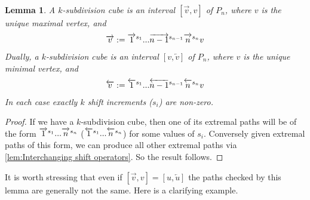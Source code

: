 \documentclass{amsart}
\newtheorem{lemma}[theorem]{Lemma}
\theoremstyle{definition}
\newcommand{\rightshiftk}[2]{\overrightarrow{\vphantom{1}{#1}}^{#2}}
\newcommand{\leftshiftk}[2]{\overleftarrow{\vphantom{1}{#1}}^{#2}}
\begin{document}
\begin{lemma} \label{lem:subdiv cubes are intervals}
A $k$-subdivision cube is an interval $[\overrightarrow{v},v]$ of $P_n$, where $v$ is the unique maximal vertex, and 
\begin{align*}
    \overrightarrow{v}:= \rightshiftk{1}{s_1}... \rightshiftk{n-1}{s_{n-1}}\rightshiftk{n}{s_n}v
\end{align*}
Dually, a $k$-subdivision cube is an interval $[v,\overleftarrow{v}]$ of $P_n$, where $v$ is the unique minimal vertex, and 
\begin{align*}
    \overleftarrow{v} :=\leftshiftk{1}{s_1}...\leftshiftk{n-1}{s_{n-1}}\leftshiftk{n}{s_n}v
\end{align*}
In each case exactly $k$ shift increments ($s_i$) are non-zero.
\end{lemma}
\begin{proof}
If we have a $k$-subdivision cube, then one of its extremal paths will be of the form
$\rightshiftk{1}{s_1}... \rightshiftk{n}{s_n}$ ($\leftshiftk{1}{s_1}...\leftshiftk{n}{s_n}$) for some values of $s_i$.
Conversely given extremal paths of this form, we can produce all other extremal paths via \cref{lem:Interchanging shift operators}. So the result follows.

\end{proof}
It is worth stressing that even if  $[\overrightarrow{v},v] = [u,\overleftarrow{u}]$ the paths checked by this lemma are generally not the same. Here is a clarifying example.
\end{document}
